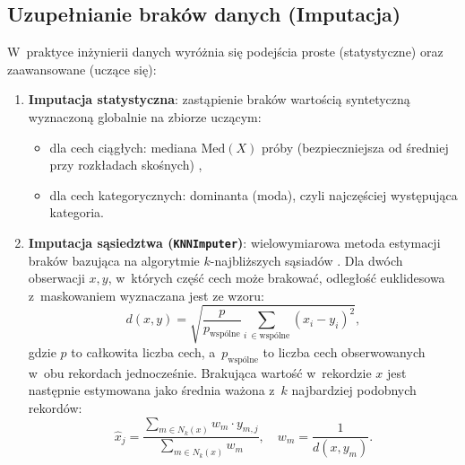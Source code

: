 \subsection{Uzupełnianie braków danych (Imputacja)}
W~praktyce inżynierii danych wyróżnia się podejścia proste (statystyczne) oraz zaawansowane (uczące się):
\begin{enumerate}
    \item \textbf{Imputacja statystyczna}: zastąpienie braków wartością syntetyczną wyznaczoną globalnie na zbiorze uczącym:
    \begin{itemize}
        \item dla cech ciągłych: mediana $\mathrm{Med}(X)$ próby (bezpieczniejsza od średniej przy rozkładach skośnych) \cite{Walker2021},
        \item dla cech kategorycznych: dominanta (moda), czyli najczęściej występująca kategoria.
    \end{itemize}
    \item \textbf{Imputacja sąsiedztwa (\texttt{KNNImputer})}: wielowymiarowa metoda estymacji braków bazująca na algorytmie $k$-najbliższych sąsiadów \cite{SklearnDocs}. Dla dwóch obserwacji $x, y$, w~których część cech może brakować, odległość euklidesowa z~maskowaniem wyznaczana jest ze wzoru:
    \begin{equation}
    d(x, y) = \sqrt{ \frac{p}{p_{\text{wspólne}}} \sum_{i~\in \text{wspólne}} (x_i - y_i)^2 },
    \end{equation}
    gdzie $p$ to całkowita liczba cech, a~$p_{\text{wspólne}}$ to liczba cech obserwowanych w~obu rekordach jednocześnie. Brakująca wartość w~rekordzie $x$ jest następnie estymowana jako średnia ważona z~$k$ najbardziej podobnych rekordów:
    \begin{equation}
    \hat{x}_j = \frac{\sum_{m \in N_k(x)} w_m \cdot y_{m,j}}{\sum_{m \in N_k(x)} w_m}, \quad w_m = \frac{1}{d(x, y_m)}.
    \end{equation}
\end{enumerate}

